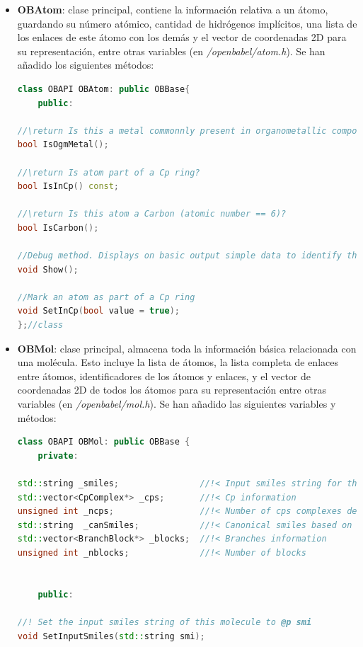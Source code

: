 \begin{itemize}
    \item \textbf{OBAtom}: clase principal, contiene la información relativa a un átomo, guardando su número atómico, cantidad de hidrógenos implícitos, una lista de los enlaces de este átomo con los demás y el vector de coordenadas 2D para su representación, entre otras variables (en \textit{/openbabel/atom.h}). Se han añadido los siguientes métodos:
    \begin{lstlisting}[language=C++]
class OBAPI OBAtom: public OBBase{
    public: 
    
//\return Is this a metal commonnly present in organometallic compounds?
bool IsOgmMetal();

//\return Is atom part of a Cp ring?
bool IsInCp() const;

//\return Is this atom a Carbon (atomic number == 6)?
bool IsCarbon();

//Debug method. Displays on basic output simple data to identify the atom
void Show();

//Mark an atom as part of a Cp ring
void SetInCp(bool value = true);
};//class
    \end{lstlisting}


    \item \textbf{OBMol}: clase principal, almacena toda la información básica relacionada con una molécula. Esto incluye la lista de átomos, la lista completa de enlaces entre átomos, identificadores de los átomos y enlaces, y el vector de coordenadas 2D de todos los átomos para su representación entre otras variables (en \textit{/openbabel/mol.h}). Se han añadido las siguientes variables y métodos:
    \begin{lstlisting}[language=C++]
class OBAPI OBMol: public OBBase {
    private: 
    
std::string _smiles;                //!< Input smiles string for the molecule
std::vector<CpComplex*> _cps;       //!< Cp information
unsigned int _ncps;                 //!< Number of cps complexes detected
std::string  _canSmiles;            //!< Canonical smiles based on Ogm canonicalization
std::vector<BranchBlock*> _blocks;  //!< Branches information
unsigned int _nblocks;              //!< Number of blocks


    public: 
    
//! Set the input smiles string of this molecule to @p smi
void SetInputSmiles(std::string smi);


\end{lstlisting}
\end{itemize}
